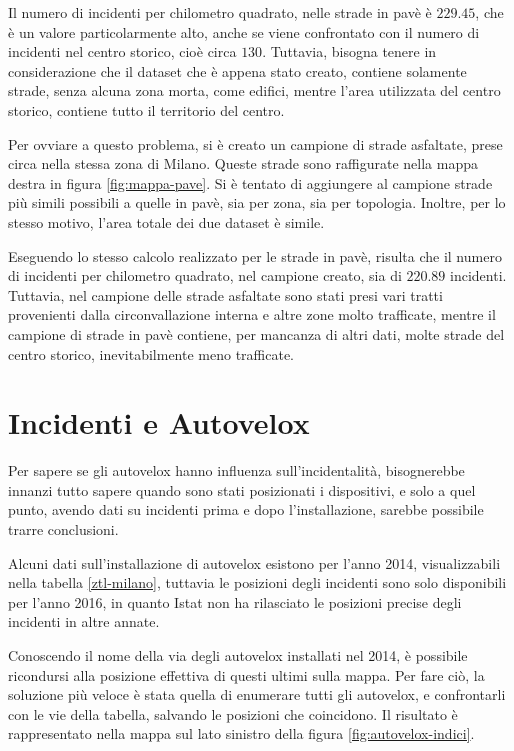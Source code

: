 \documentclass[a4paper,12pt]{report}
\begin{document}
Il numero di incidenti per chilometro quadrato, nelle strade in pavè è $229.45$, che 
è un valore particolarmente alto, anche se viene confrontato con il numero di 
incidenti nel centro storico, cioè circa $130$.
Tuttavia, bisogna tenere in considerazione che il dataset che è appena stato creato, 
contiene solamente strade, senza alcuna zona morta, come edifici, mentre l'area utilizzata 
del centro storico, contiene tutto il territorio del centro.

Per ovviare a questo problema, si è creato un campione di strade asfaltate, prese circa 
nella stessa zona di Milano. 
Queste strade sono raffigurate nella mappa destra in figura \ref{fig:mappa-pave}. 
Si è tentato di aggiungere al campione strade più simili possibili a 
quelle in pavè, sia per zona, sia per topologia. 
Inoltre, per lo stesso motivo, l'area totale dei due dataset è simile.

Eseguendo lo stesso calcolo realizzato per le strade in pavè, risulta che il numero di incidenti per 
chilometro quadrato, nel campione creato, sia di $220.89$ incidenti.
Tuttavia, nel campione delle strade asfaltate sono stati presi vari tratti provenienti dalla 
circonvallazione interna e altre zone molto trafficate, mentre il campione di strade in pavè 
contiene, per mancanza di altri dati, molte strade del centro storico, inevitabilmente 
meno trafficate.

\section{Incidenti e Autovelox}

Per sapere se gli autovelox hanno influenza sull'incidentalità, 
bisognerebbe innanzi tutto sapere quando sono stati posizionati i dispositivi, e solo 
a quel punto, avendo dati su incidenti prima e dopo l'installazione, sarebbe 
possibile trarre conclusioni.

Alcuni dati sull'installazione di autovelox esistono per l'anno 2014, visualizzabili 
nella tabella \ref{ztl-milano}, tuttavia le posizioni degli incidenti 
sono solo disponibili per l'anno 2016, in quanto Istat non ha rilasciato 
le posizioni precise degli incidenti in altre annate.

Conoscendo il nome della via degli autovelox installati nel 2014, è possibile ricondursi 
alla posizione effettiva di questi ultimi sulla mappa.
Per fare ciò, la soluzione più veloce è stata quella di enumerare tutti gli autovelox, 
e confrontarli con le vie della tabella, salvando le posizioni che coincidono.
Il risultato è rappresentato nella mappa sul lato sinistro della 
figura \ref{fig:autovelox-indici}.
\end{document}
